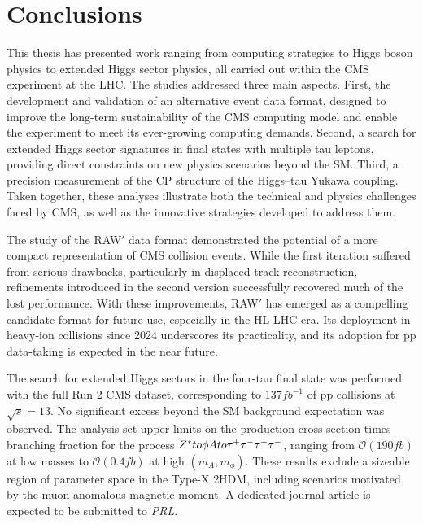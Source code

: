 \chapter{Conclusions}
\thispagestyle{plain}  %
\pagestyle{chapterpages}
\label{Section:Conclusions}

This thesis has presented work ranging from computing strategies to Higgs boson physics to extended Higgs sector physics, all carried out within the \ac{CMS} experiment at the \ac{LHC}. The studies addressed three main aspects. First, the development and validation of an alternative event data format, designed to improve the long-term sustainability of the CMS computing model and enable the experiment to meet its ever-growing computing demands. Second, a search for extended Higgs sector signatures in final states with multiple tau leptons, providing direct constraints on new physics scenarios beyond the \ac{SM}. Third, a precision measurement of the CP structure of the Higgs–tau Yukawa coupling. Taken together, these analyses illustrate both the technical and physics challenges faced by CMS, as well as the innovative strategies developed to address them.

The study of the RAW$'$ data format demonstrated the potential of a more compact representation of \ac{CMS} collision events. While the first iteration suffered from serious drawbacks, particularly in displaced track reconstruction, refinements introduced in the second version successfully recovered much of the lost performance. With these improvements, RAW$'$ has emerged as a compelling candidate format for future use, especially in the \ac{HL}-\ac{LHC} era. Its deployment in heavy-ion collisions since 2024 underscores its practicality, and its adoption for pp data-taking is expected in the near future.

The search for extended Higgs sectors in the four-tau final state was performed with the full Run 2 CMS dataset, corresponding to $137\unit{fb}^{-1}$ of pp collisions at $\sqrt{s} = 13$\TeV. No significant excess beyond the \ac{SM} background expectation was observed. The analysis set upper limits on the production cross section times branching fraction for the process $Z^* to \phi A to \tau^+\tau^-\tau^+\tau^-$, ranging from $\mathcal{O}(190\unit{fb})$ at low masses to $\mathcal{O}(0.4\unit{fb})$ at high $(m_A, m_\phi)$. These results exclude a sizeable region of parameter space in the Type-X \ac{2HDM}, including scenarios motivated by the muon anomalous magnetic moment. A dedicated journal article is expected to be submitted to \textit{PRL}.

